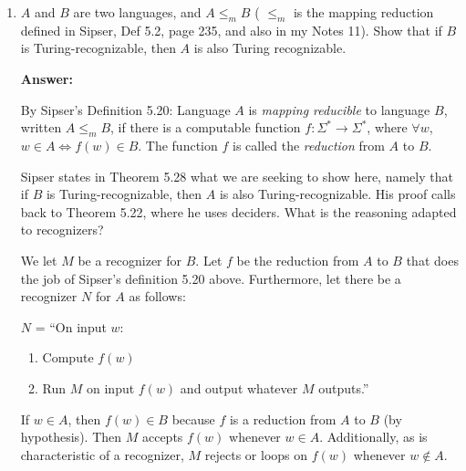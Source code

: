 \documentclass[11pt]{article}
\begin{document}
\vline

\begin{enumerate}[label=\textbf{Exercise \arabic{*}}]

  \item $A$ and $B$ are two languages, and $A \le_m B$ ( $\le_m$ is the mapping reduction defined in Sipser, Def 5.2, page 235, and also in my Notes 11). Show that if $B$ is Turing-recognizable, then $A$ is also Turing recognizable.

        \medskip

        \textbf{Answer:}

        By Sipser's Definition 5.20:
        Language $A$ is \emph{mapping reducible} to language $B$, written $A \le_m B$, if there is a computable function $f: \Sigma^* \to \Sigma^*$, where $\forall w$, $w \in A \iff f(w) \in B$. The function $f$ is called the \emph{reduction} from $A$ to $B$.

        Sipser states in Theorem 5.28 what we are seeking to show here, namely that if $B$ is Turing-recognizable, then $A$ is also Turing-recognizable. His proof calls back to Theorem 5.22, where he uses deciders. What is the reasoning adapted to recognizers?

        We let $M$ be a recognizer for $B$. Let $f$ be the reduction from $A$ to $B$ that does the job of Sipser's definition 5.20 above. Furthermore, let there be a recognizer $N$ for $A$ as follows:

        $N$ = ``On input $w$:
        \begin{enumerate}
          \item Compute $f(w)$
          \item Run $M$ on input $f(w)$ and output whatever $M$ outputs.''
        \end{enumerate}

        If $w \in A$, then $f(w) \in B$ because $f$ is a reduction from $A$ to $B$ (by hypothesis). Then $M$ accepts $f(w)$ whenever $w \in A$. Additionally, as is characteristic of a recognizer, $M$ rejects or loops on $f(w)$ whenever $w \not\in A$.


\end{enumerate}
\end{document}
